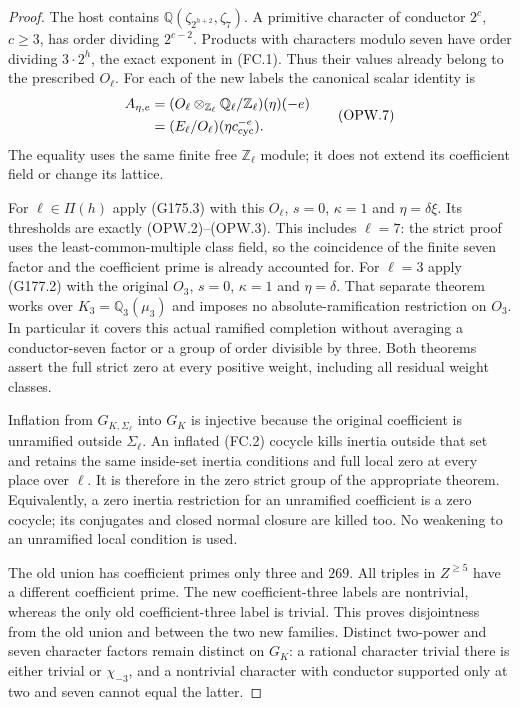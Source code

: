 \begin{proof}
The host contains $\mathbb Q(\zeta_{2^{h+2}},\zeta_7)$.
A primitive character of conductor $2^c$, $c\geq3$, has order
dividing $2^{c-2}$.  Products with characters modulo seven have
order dividing $3\cdot2^h$, the exact exponent in (FC.1).
Thus their values already belong to the prescribed $O_\ell$.
For each of the new labels the canonical scalar identity is
\[
 \begin{aligned}
 A_{\eta,e}
   &=(O_\ell\otimes_{\mathbb Z_\ell}\mathbb Q_\ell/\mathbb Z_\ell)
                  (\eta)(-e)\\
   &=(E_\ell/O_\ell)(\eta c_{\rm cyc}^{-e}).
 \end{aligned}
 \tag{OPW.7}
\]
The equality uses the same finite free $\mathbb Z_\ell$ module;
it does not extend its coefficient field or change its lattice.

For $\ell\in\Pi(h)$ apply (G175.3) with this $O_\ell$,
$s=0$, $\kappa=1$ and $\eta=\delta\xi$.
Its thresholds are exactly (OPW.2)--(OPW.3).
This includes $\ell=7$: the strict proof uses the least-common-multiple
class field, so the coincidence of the finite seven factor and the
coefficient prime is already accounted for.
For $\ell=3$ apply (G177.2) with the original $O_3$, $s=0$,
$\kappa=1$ and $\eta=\delta$.
That separate theorem works over $K_3=\mathbb Q_3(\mu_3)$ and
imposes no absolute-ramification restriction on $O_3$.
In particular it covers this actual ramified completion without
averaging a conductor-seven factor or a group of order divisible by three.
Both theorems assert the full strict zero at every positive weight,
including all residual weight classes.

Inflation from $G_{K,\Sigma_\ell}$ into $G_K$ is injective because
the original coefficient is unramified outside $\Sigma_\ell$.
An inflated (FC.2) cocycle kills inertia outside that set and
retains the same inside-set inertia conditions and full local zero
at every place over $\ell$.
It is therefore in the zero strict group of the appropriate theorem.
Equivalently, a zero inertia restriction for an unramified coefficient
is a zero cocycle; its conjugates and closed normal closure are
killed too.  No weakening to an unramified local condition is used.

The old union has coefficient primes only three and $269$.
All triples in $Z^{\geq5}$ have a different coefficient prime.
The new coefficient-three labels are nontrivial, whereas the only
old coefficient-three label is trivial.  This proves disjointness
from the old union and between the two new families.
Distinct two-power and seven character factors remain distinct
on $G_K$: a rational character trivial there is either trivial or
$\chi_{-3}$, and a nontrivial character with conductor supported
only at two and seven cannot equal the latter.


\end{proof}
